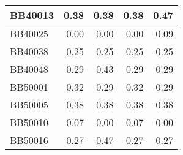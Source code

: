 \begin{table}[!htbp]
\begin{tabular}{|l|r|r|r|r|}
		\hline
		BB40013 & \cellcolor[rgb]{ .384,  .745,  .478}0.38 & \cellcolor[rgb]{ .384,  .745,  .478}0.38 & \cellcolor[rgb]{ .384,  .745,  .478}0.38 & \cellcolor[rgb]{ .988,  1,  .992}0.47 \\
		\hline
		BB40025 & \cellcolor[rgb]{ .384,  .745,  .478}0.00 & \cellcolor[rgb]{ .384,  .745,  .478}0.00 & \cellcolor[rgb]{ .384,  .745,  .478}0.00 & \cellcolor[rgb]{ .988,  1,  .992}0.09 \\
		\hline
		BB40038 & \cellcolor[rgb]{ .988,  1,  .992}0.25 & \cellcolor[rgb]{ .988,  1,  .992}0.25 & \cellcolor[rgb]{ .988,  1,  .992}0.25 & \cellcolor[rgb]{ .988,  1,  .992}0.25 \\
		\hline
		BB40048 & \cellcolor[rgb]{ .384,  .745,  .478}0.29 & \cellcolor[rgb]{ .988,  1,  .992}0.43 & \cellcolor[rgb]{ .384,  .745,  .478}0.29 & \cellcolor[rgb]{ .384,  .745,  .478}0.29 \\
		\hline
		BB50001 & \cellcolor[rgb]{ .988,  1,  .992}0.32 & \cellcolor[rgb]{ .384,  .745,  .478}0.29 & \cellcolor[rgb]{ .988,  1,  .992}0.32 & \cellcolor[rgb]{ .384,  .745,  .478}0.29 \\
		\hline
		BB50005 & \cellcolor[rgb]{ .988,  1,  .992}0.38 & \cellcolor[rgb]{ .988,  1,  .992}0.38 & \cellcolor[rgb]{ .988,  1,  .992}0.38 & \cellcolor[rgb]{ .988,  1,  .992}0.38 \\
		\hline
		BB50010 & \cellcolor[rgb]{ .988,  1,  .992}0.07 & \cellcolor[rgb]{ .384,  .745,  .478}0.00 & \cellcolor[rgb]{ .988,  1,  .992}0.07 & \cellcolor[rgb]{ .384,  .745,  .478}0.00 \\
		\hline
		BB50016 & \cellcolor[rgb]{ .384,  .745,  .478}0.27 & \cellcolor[rgb]{ .988,  1,  .992}0.47 & \cellcolor[rgb]{ .384,  .745,  .478}0.27 & \cellcolor[rgb]{ .384,  .745,  .478}0.27 \\
		\hline		
	\end{tabular}%
	\label{tab:pasta-variants-a}%
\end{table}%



